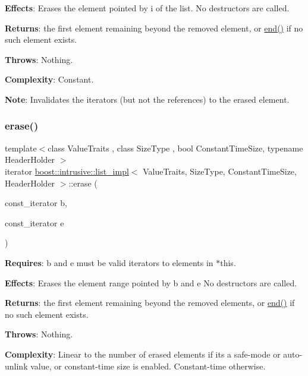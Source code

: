 {\bfseries Effects}\+: Erases the element pointed by i of the list. No destructors are called.

{\bfseries Returns}\+: the first element remaining beyond the removed element, or \hyperlink{classboost_1_1intrusive_1_1list__impl_af2a454471fced6d4b2fb899c50bbee67}{end()} if no such element exists.

{\bfseries Throws}\+: Nothing.

{\bfseries Complexity}\+: Constant.

{\bfseries Note}\+: Invalidates the iterators (but not the references) to the erased element. \mbox{\label{classboost_1_1intrusive_1_1list__impl_a267b1e44859c98eb3dbd9ad865910f61}} 
\subsubsection{\texorpdfstring{erase()}{erase()}\hspace{0.1cm}{\footnotesize\ttfamily [2/3]}}
{\footnotesize\ttfamily template$<$class Value\+Traits , class Size\+Type , bool Constant\+Time\+Size, typename Header\+Holder $>$ \\
iterator \hyperlink{classboost_1_1intrusive_1_1list__impl}{boost\+::intrusive\+::list\+\_\+impl}$<$ Value\+Traits, Size\+Type, Constant\+Time\+Size, Header\+Holder $>$\+::erase (\begin{DoxyParamCaption}\item[{const\+\_\+iterator}]{b,  }\item[{const\+\_\+iterator}]{e }\end{DoxyParamCaption})\hspace{0.3cm}{\ttfamily [inline]}}

{\bfseries Requires}\+: b and e must be valid iterators to elements in $\ast$this.

{\bfseries Effects}\+: Erases the element range pointed by b and e No destructors are called.

{\bfseries Returns}\+: the first element remaining beyond the removed elements, or \hyperlink{classboost_1_1intrusive_1_1list__impl_af2a454471fced6d4b2fb899c50bbee67}{end()} if no such element exists.

{\bfseries Throws}\+: Nothing.

{\bfseries Complexity}\+: Linear to the number of erased elements if it\textquotesingle{}s a safe-\/mode or auto-\/unlink value, or constant-\/time size is enabled. Constant-\/time otherwise.


